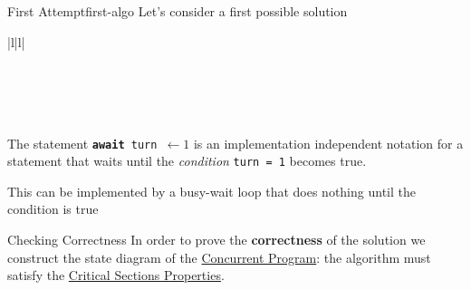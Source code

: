 \begin{remark}{First Attempt}{first-algo}
    Let's consider a first possible solution
    \begin{ctable}{|l|l|}
        \hline
         \\
        \hline
         \\
        \hline
         \\
         \\
         \\
        \hline
    \end{ctable}
    The statement \texttt{\textbf{await} turn $\leftarrow 1$} is an implementation independent notation for a statement that waits until the \textit{condition} \texttt{turn = 1} becomes true.
    \begin{note}
        This can be implemented by a busy-wait loop that does nothing until the condition is true
        \begin{warning}[Inefficient]
        \end{warning}
    \end{note}
    \begin{outerproof}{Checking Correctness}{}
        In order to prove the \textbf{correctness} of the solution we construct the state diagram of the \hyperref[def:conc-prog]{Concurrent Program}: the algorithm must satisfy the \hyperref[sub:cp_critical_sections_properties]{Critical Sections Properties}.

\end{outerproof}
\end{remark}
